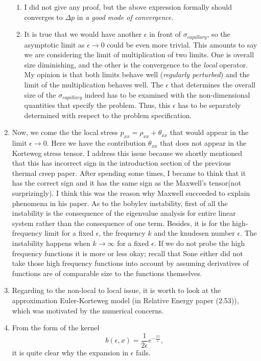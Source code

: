 \documentclass[a4paper,12pt]{article}
\begin{document}
\begin{enumerate}
\begin{enumerate}
\item I did not give any proof, but the above expression formally should converges to $\Delta p$ in {\it a good mode of convergence}.
\item It is true that we would have another $\epsilon$ in front of $\sigma_{capillary}$, so the asymptotic limit as $\epsilon \rightarrow 0$ could be even more trivial. This amounts to say we are considering the limit of multiplication of two limits. One is overall size diminishing, and the other is the convergence to the {\it local} operator. My opinion is that both limits behave well ({\it regularly perturbed}) and the limit of the multiplication behaves well. The $\epsilon$ that determines the overall size of the $\sigma_{capillary}$ indeed has to be examined with the non-dimensional quantities that specify the problem. Thus, this $\epsilon$ has to be separately determined with respect to the problem specification.
\end{enumerate}
\item Now, we come the the local stress $p_{xx} = \rho_{xx} + \theta_{xx}$ that would appear in the limit $\epsilon \rightarrow 0$. Here we have the contribution $\theta_{xx}$ that does not appear in the Korteweg stress tensor. I address this issue because we shortly mentioned that this has incorrect sign in the introduction section of the previous thermal creep paper. After spending some times, I became to think that it has the correct sign and it has the same sign as the Maxwell's tensor(not surprizingly). I think this was the reason why Maxwell succeeded to explain phenomena in his paper. As to the bobylev instability, first of all the instability is the consequence of the eigenvalue analysis for entire linear system rather than the consequence of one term. Besides, it is for the high-frequency limit for a fixed $\epsilon$, the frequency $k$ and the knudesen number $\epsilon$. The instability happens when $k \rightarrow \infty$ for a fixed $\epsilon$. If we do not probe the high frequency functions it is more or less okay; recall that Sone either did not take those high frequency functions into account by assuming derivatives of functions are of comparable size to the functions themselves.

\item Regarding to the non-local to local issue, it is worth to look at the approximation Euler-Korteweg model (in Relative Energy paper (2.53)), which was motivated by the numerical concerns.

\item From the form of the kernel 
$$ b(\epsilon,x) = \frac{1}{2\epsilon} e^{-\frac{|x|}{\epsilon}}, $$
it is quite clear why the expansion in $\epsilon$ fails.
\end{enumerate}
\end{document}
